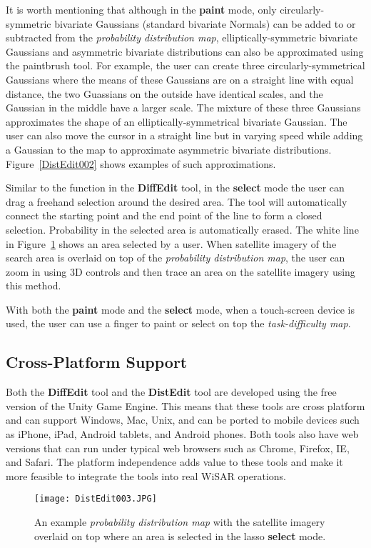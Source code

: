 It is worth mentioning that although in the \textbf{paint} mode, only circularly-symmetric bivariate Gaussians (standard bivariate Normals) can be added to or subtracted from the \textit{probability distribution map}, elliptically-symmetric bivariate Gaussians and asymmetric bivariate distributions can also be approximated using the paintbrush tool. For example, the user can create three circularly-symmetrical Gaussians where the means of these Gaussians are on a straight line with equal distance, the two Guassians on the outside have identical scales, and the Gaussian in the middle have a larger scale. The mixture of these three Gaussians approximates the shape of an elliptically-symmetrical bivariate Gaussian. The user can also move the cursor in a straight line but in varying speed while adding a Gaussian to the map to approximate asymmetric bivariate distributions. Figure~\ref{DistEdit002} shows examples of such approximations.

Similar to the function in the \textbf{DiffEdit} tool, in the \textbf{select} mode the user can drag a freehand selection around the desired area. The tool will automatically connect the starting point and the end point of the line to form a closed selection. Probability in the selected area is automatically erased. The white line in Figure~\ref{DistEdit003} shows an area selected by a user. When satellite imagery of the search area is overlaid on top of the \textit{probability distribution map}, the user can zoom in using 3D controls and then trace an area on the satellite imagery using this method.

With both the \textbf{paint} mode and the \textbf{select} mode, when a touch-screen device is used, the user can use a finger to paint or select on top the \textit{task-difficulty map}.

\subsection{Cross-Platform Support}

Both the \textbf{DiffEdit} tool and the \textbf{DistEdit} tool are developed using the free version of the Unity Game Engine. This means that these tools are cross platform and can support Windows, Mac, Unix, and can be ported to mobile devices such as iPhone, iPad, Android tablets, and Android phones. Both tools also have web versions that can run under typical web browsers such as Chrome, Firefox, IE, and Safari. The platform independence adds value to these tools and make it more feasible to integrate the tools into real WiSAR operations.

\begin{figure}
\centering
\texttt{[image: DistEdit003.JPG]}
\caption[An example of overlaying satellite imagery and lasso select]{An example \textit{probability distribution map} with the satellite imagery overlaid on top where an area is selected in the lasso \textbf{select} mode.}
\label{DistEdit003}
\end{figure}
